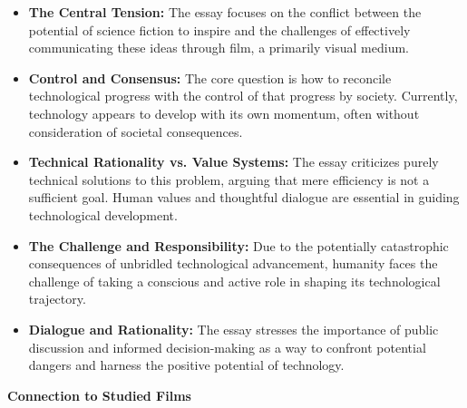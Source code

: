 \documentclass[11pt,fleqn]{book} %
\begin{document}
\begin{itemize}
\item \textbf{The Central Tension:} The essay focuses on the conflict between the potential of science fiction to inspire and the challenges of effectively communicating these ideas through film, a primarily visual medium. 

\item \textbf{Control and Consensus:} The core question is how to reconcile technological progress with the control of that progress by society. Currently, technology appears to develop with its own momentum, often without consideration of societal consequences.

\item \textbf{Technical Rationality vs. Value Systems:} The essay criticizes purely technical solutions to this problem, arguing that mere efficiency is not a sufficient goal. Human values and thoughtful dialogue are essential in guiding technological development.

\item \textbf{The Challenge and Responsibility:} Due to the potentially catastrophic consequences of unbridled technological advancement, humanity faces the challenge of taking a conscious and active role in shaping its technological trajectory. 

\item \textbf{Dialogue and Rationality:} The essay stresses the importance of public discussion and informed decision-making as a way to confront potential dangers and harness the positive potential of technology.  
\end{itemize}
\vspace{5pt}
\textbf{Connection to Studied Films}
\end{document}
